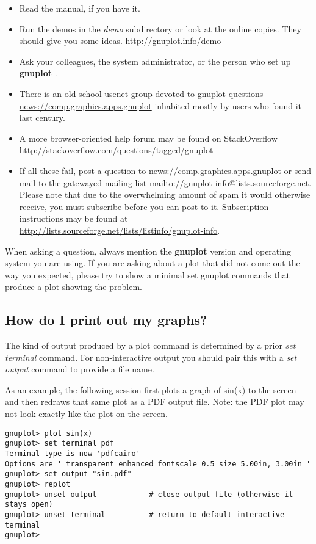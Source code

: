 \documentclass[a4paper,11pt]{article}
\def\http#1{{\small\href{http://#1}{\url{http://#1}}}}
\def\mailto#1{{\small\href{mailto://#1}{\url{mailto://#1}}}}
\def\news#1{\href{news://#1}{\url{news://#1}}}
\newcommand{\news}[1]%
            {\def~{\~{}}\htmladdnormallink{\latex{\url{#1}}\html{\textit{#1}}}%
                {news:#1}%
            }
\newcommand{\mailto}[1]%
            {\htmladdnormallink{\latex{\url{<#1>}}\html{\textit{#1}}}%
                {mailto:#1}%
            }
\newcommand{\http}[1]%
            {\htmladdnormallink{\latex{\url{http://#1}}%
                    \html{\textit{http://#1}}}%
                {http://#1}%
            }
\newcommand{\gnuplot}{\textbf{gnuplot }}
\begin{document}
\begin{itemize}
\item
Read the manual, if you have it.

\item
Run the demos in the {\em demo} subdirectory or look at the 
online copies. They should give you some ideas.
\http{gnuplot.info/demo}

\item
Ask your colleagues, the system administrator, or the person who
set up \gnuplot.

\item
There is an old-school usenet group devoted to gnuplot questions
\news{comp.graphics.apps.gnuplot}
inhabited mostly by users who found it last century.

\item
A more browser-oriented help forum may be found on StackOverflow
\http{stackoverflow.com/questions/tagged/gnuplot}

\item
If all these fail, post a question to \news{comp.graphics.apps.gnuplot} or send mail
to the gatewayed mailing list \mailto{gnuplot-info@lists.sourceforge.net}.
Please note that due to the overwhelming amount of spam it would otherwise receive,
you must subscribe before you can post to it. Subscription instructions 
may be found at
\http{lists.sourceforge.net/lists/listinfo/gnuplot-info}.

\end{itemize}
When asking a question, always mention the \gnuplot version and
operating system you are using.  If you are asking about a plot that 
did not come out the way you expected, please try to show a minimal
set gnuplot commands that produce a plot showing the problem.


\subsection{How do I print out my graphs?}

The kind of output produced by a plot command is determined by a
prior {\em set terminal} command.  For non-interactive output
you should pair this with a {\em set output} command to provide
a file name.

As an example, the following session first plots a graph of sin(x) to the
screen and then redraws that same plot as a PDF output file.
Note: the PDF plot may not look exactly like the plot on the screen.

\small
\begin{verbatim}
gnuplot> plot sin(x)
gnuplot> set terminal pdf
Terminal type is now 'pdfcairo'
Options are ' transparent enhanced fontscale 0.5 size 5.00in, 3.00in '
gnuplot> set output "sin.pdf"
gnuplot> replot
gnuplot> unset output            # close output file (otherwise it stays open)
gnuplot> unset terminal          # return to default interactive terminal
gnuplot>
\end{verbatim}
\normalsize
\end{document}
